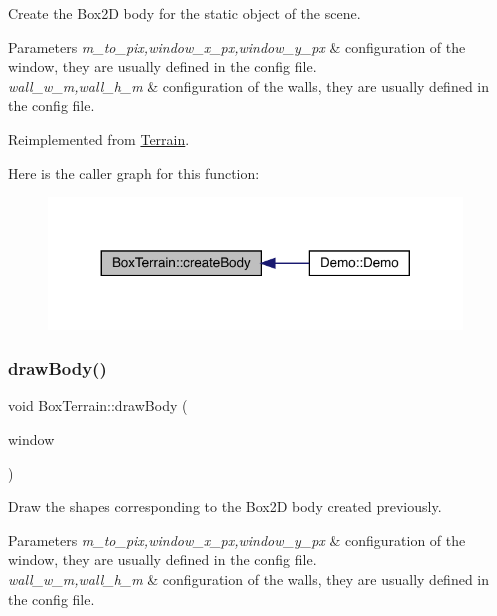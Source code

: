 Create the Box2D body for the static object of the scene. 
\begin{DoxyParams}{Parameters}
{\em m\+\_\+to\+\_\+pix,window\+\_\+x\+\_\+px,window\+\_\+y\+\_\+px} & configuration of the window, they are usually defined in the config file. \\
\hline
{\em wall\+\_\+w\+\_\+m,wall\+\_\+h\+\_\+m} & configuration of the walls, they are usually defined in the config file. \\
\hline
\end{DoxyParams}


Reimplemented from \mbox{\hyperlink{class_terrain_a97e007277f8abb9dde20ef2b49c38a3a}{Terrain}}.

Here is the caller graph for this function\+:\nopagebreak
\begin{figure}[H]
\begin{center}
\leavevmode
\includegraphics[width=311pt]{class_box_terrain_a7f5172beaa4e5dcb4d45f3c5e46e3155_icgraph}
\end{center}
\end{figure}
\mbox{\label{class_box_terrain_a309e67722a008ef166198d36add1690a}} 
\subsubsection{\texorpdfstring{draw\+Body()}{drawBody()}}
{\footnotesize\ttfamily void Box\+Terrain\+::draw\+Body (\begin{DoxyParamCaption}\item[{sf\+::\+Render\+Window \&}]{window }\end{DoxyParamCaption})\hspace{0.3cm}{\ttfamily [virtual]}}

Draw the shapes corresponding to the Box2D body created previously. 
\begin{DoxyParams}{Parameters}
{\em m\+\_\+to\+\_\+pix,window\+\_\+x\+\_\+px,window\+\_\+y\+\_\+px} & configuration of the window, they are usually defined in the config file. \\
\hline
{\em wall\+\_\+w\+\_\+m,wall\+\_\+h\+\_\+m} & configuration of the walls, they are usually defined in the config file. \\
\hline
\end{DoxyParams}


